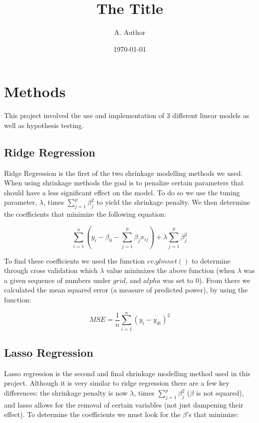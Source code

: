 \documentclass{article}
\begin{document}


\title{The Title}
\author{A. Author}
\date{\today}

\maketitle



\section{Methods}

This project involved the use and implementation of 3 different linear models as well as hypothesis testing.

\subsection{Ridge Regression}

Ridge Regression is the first of the two shrinkage modelling methods we used.  When using shrinkage methods the goal is to penalize certain parameters that should have a less significant effect on the model. To do so we use the tuning parameter, $\lambda$, times $\sum_{j=1}^{p}\beta_{j}^{2}$ to yield the shrinkage penalty. We then determine the coefficients that minimize the following equation:

\begin{equation}
\sum_{i=1}^{n}(y_i-\beta_0-\sum_{j=1}^{p}\beta_jx_{ij}) + \lambda\sum_{j=1}^{p}\beta_{j}^{2}
\end{equation}

To find these coefficients we used the function $cv.glmnet()$ to determine through cross validation which $\lambda$ value minimizes the above function (when $\lambda$ was a given sequence of numbers under $grid$, and $alpha$ was set to 0). From there we calculated the mean squared error (a measure of predicted power), by using the function:

\begin{equation}
MSE = \frac{1}{n}\sum_{i=1}^{n}(y_i - y_{di})^2
\end{equation}

\subsection{Lasso Regression}

Lasso regression is the second and final shrinkage modelling method used in this project. Although it is very similar to ridge regression there are a few key differences: the shrinkage penalty is now $\lambda$, times $\sum_{j=1}^{p}\beta_{j}^{2}$ ($\beta$ is not squared), and lasso allows for the removal of certain variables (not just dampening their effect). To determine the coefficients we must look for the $\beta$'s that minimize:
\end{document}
